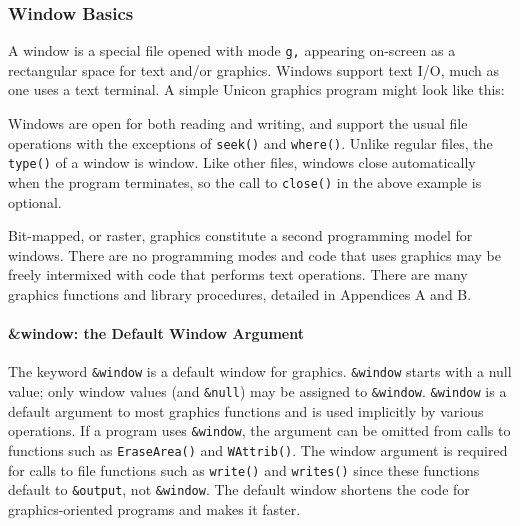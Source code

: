 \subsubsection{Window Basics}

A window is a special file opened with mode
\texttt{{\textquotedbl}g{\textquotedbl},} appearing on-screen as a
rectangular space for text and/or graphics. Windows support text I/O,
much as one uses a text terminal. A simple
Unicon graphics program might look like this:


Windows are open for both reading and writing, and support the usual
file operations with the exceptions of \texttt{seek()} and
\texttt{where()}. Unlike regular files, the \texttt{type()} of a
window is {\textquotedbl}window{\textquotedbl}. Like other files,
windows close automatically when the program terminates, so the call to
\texttt{close()} in the above example is optional.

Bit-mapped, or raster, graphics constitute a second programming model
for windows. There are no programming
{\textquotedbl}modes{\textquotedbl} and code that uses graphics may be
freely intermixed with code that performs text operations. There are
many graphics functions and library procedures, detailed in Appendices
A and B.

\paragraph{\&window: the Default Window Argument}

The keyword \texttt{\&window} is a default window for graphics.
\texttt{\&window} starts with a null value; only window values
(and \texttt{\&null}) may
be assigned to \texttt{\&window}. \texttt{\&window} is a default
argument to most graphics functions and is used implicitly by various
operations. If a program uses \texttt{\&window}, the argument can be
omitted from calls to functions such as \texttt{EraseArea()} and
\texttt{WAttrib()}. The window argument is required for calls to file
functions such as \texttt{write()} and \texttt{writes()} since these
functions default to \texttt{\&output}, not \texttt{\&window}. The
default window shortens the code for graphics-oriented programs and
makes it faster.

